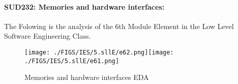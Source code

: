 \documentclass[12pt]{extreport}
\begin{document}
\begin{comment}

\subparagraph{Interpretation of the Box-plots:}
For This Element 

\begin{enumerate}	
	\item The MP Class Box-Plot:
	\begin{enumerate}
		\item MAX = a {} {} {} {} {} {} {} {} UQ = b {} {} {} {} {} {} {} {} Median = c
		\item LQ = d {} {} {} {} {} {} {} {}  MIN =	l {} {} {} {} {} {} {} {}  IQR = e - f = g
	\end{enumerate}
	\item The PSI Class Box-Plot:
	\begin{enumerate}
		\item MAX = a {} {} {} {} {} {} {} {} UQ = b {} {} {} {} {} {} {} {} Median = c
		\item LQ = d {} {} {} {} {} {} {} {}  MIN =	e {} {} {} {} {} {} {} {} IQR = f - g = h	
	\end{enumerate}
	\item The TSI Class Box-Plot:
	\begin{enumerate}
		\item MAX = a {} {} {} {} {} {} {} {} UQ = b {} {} {} {} {} {} {} {} Median = c
		\item LQ = d {} {} {} {} {} {} {} {} MIN = e {} {} {} {} {} {} {} {} IQR = f - g = h	
	\end{enumerate}
\end{enumerate}



\subparagraph{Interpretation of the histogram:}
This Frequency Distribution is (Skeness) with the following descriptive statistics:
\begin{enumerate}
	\item Mean = 
	\item STD = 
	\item Range = a - b = c
	\item IQR = a-b = c 
\end{enumerate}

\end{comment}







\paragraph{\large SUD232: Memories and hardware interfaces:\\
} 
The Folowing is the analysis of the 6th Module Element in the Low Level Software Engineering Class.
\begin{figure}[H]
	\centering
	\texttt{[image: ./FIGS/IES/5.sllE/e62.png]}\texttt{[image: ./FIGS/IES/5.sllE/e61.png]}
	\caption{Memories and hardware interfaces EDA}
	\label{fig:66}
\end{figure}
\end{document}
